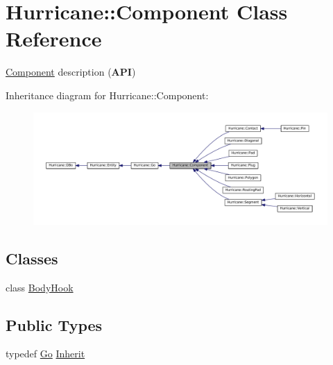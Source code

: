 \hypertarget{classHurricane_1_1Component}{}\section{Hurricane\+:\+:Component Class Reference}
\label{classHurricane_1_1Component}


\mbox{\hyperlink{classHurricane_1_1Component}{Component}} description ({\bfseries A\+PI})  




Inheritance diagram for Hurricane\+:\+:Component\+:\nopagebreak
\begin{figure}[H]
\begin{center}
\leavevmode
\includegraphics[width=350pt]{classHurricane_1_1Component__inherit__graph}
\end{center}
\end{figure}
\subsection*{Classes}
\begin{DoxyCompactItemize}
\item 
class \mbox{\hyperlink{classHurricane_1_1Component_1_1BodyHook}{Body\+Hook}}
\end{DoxyCompactItemize}
\subsection*{Public Types}
\begin{DoxyCompactItemize}
\item 
typedef \mbox{\hyperlink{classHurricane_1_1Go}{Go}} \mbox{\hyperlink{classHurricane_1_1Component_a3911e94f9d220eb809d349b1181034e3}{Inherit}}
\end{DoxyCompactItemize}
